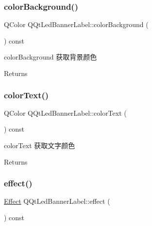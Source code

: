 \subsubsection{\texorpdfstring{color\+Background()}{colorBackground()}}
{\footnotesize\ttfamily Q\+Color Q\+Qt\+Led\+Banner\+Label\+::color\+Background (\begin{DoxyParamCaption}{ }\end{DoxyParamCaption}) const}



color\+Background 获取背景颜色 

\begin{DoxyReturn}{Returns}

\end{DoxyReturn}
\mbox{\label{class_q_qt_led_banner_label_addadadbfba0ac9afb1b78df2a5ca4cc7}} 
\subsubsection{\texorpdfstring{color\+Text()}{colorText()}}
{\footnotesize\ttfamily Q\+Color Q\+Qt\+Led\+Banner\+Label\+::color\+Text (\begin{DoxyParamCaption}{ }\end{DoxyParamCaption}) const}



color\+Text 获取文字颜色 

\begin{DoxyReturn}{Returns}

\end{DoxyReturn}
\mbox{\label{class_q_qt_led_banner_label_ad7fef5c655cd86259eaed058f8ba49df}} 
\subsubsection{\texorpdfstring{effect()}{effect()}}
{\footnotesize\ttfamily \mbox{\hyperlink{class_q_qt_led_banner_label_a8ea55a34d54e6fe09a74c5fd2d83e5dc}{Effect}} Q\+Qt\+Led\+Banner\+Label\+::effect (\begin{DoxyParamCaption}{ }\end{DoxyParamCaption}) const}



